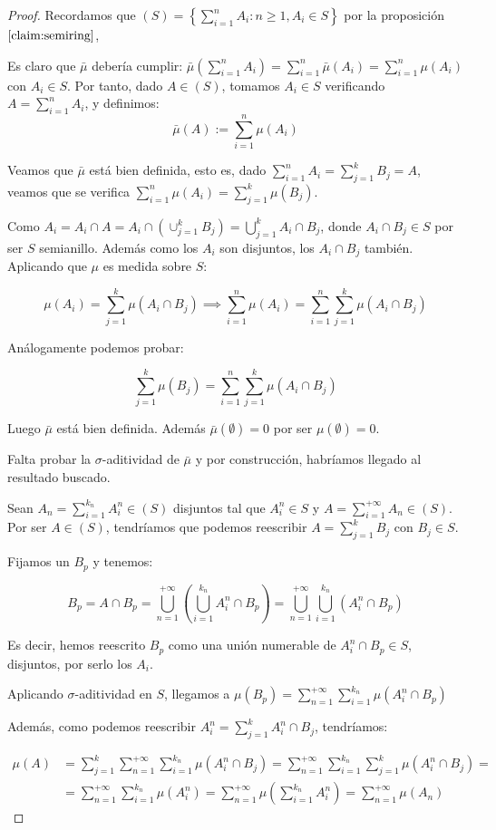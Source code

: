 \begin{proof}
 Recordamos que $(S) = \left\{\sum_{i=1}^n A_i: n\ge 1, A_i \in S \right\}$ por la proposición $\ref{claim:semiring}$,
 
 Es claro que $\bar{\mu}$ debería cumplir: 
 $\bar{\mu}\left(\sum_{i=1}^n A_i\right) = \sum_{i=1}^n \bar{\mu}(A_i) = \sum_{i=1}^n \mu(A_i)$
 con $A_i \in S$. Por tanto, dado $A\in (S)$, tomamos $A_i\in S$ verificando $A = \sum_{i=1}^n A_i$, y definimos: 
 \[\bar{\mu}(A) := \sum_{i=1}^n \mu(A_i)\]
 
 Veamos que $\bar{\mu}$ está bien definida, esto es, dado $\sum_{i=1}^n A_i = \sum_{j=1}^k B_j = A$, 
 veamos que se verifica $\sum_{i=1}^n \mu(A_i) = \sum_{j=1}^k \mu(B_j)$.
 
 Como $A_i = A_i \cap A = A_i \cap \left(\cup_{j=1}^k B_j\right) = \bigcup_{j=1}^k A_i \cap B_j$, donde 
 $A_i \cap B_j \in S$ por ser $S$ semianillo. Además como los $A_i$ son disjuntos, los $A_i\cap B_j$ también.
 Aplicando que $\mu$ es medida sobre $S$:
 
 \[\mu(A_i) = \sum_{j=1}^k \mu(A_i \cap B_j) \implies \sum_{i=1}^n \mu(A_i) = 
              \sum_{i=1}^n \sum_{j=1}^k \mu(A_i \cap B_j)\]
 
 Análogamente podemos probar:
 
 \[\sum_{j=1}^k \mu(B_j) = \sum_{i=1}^n \sum_{j=1}^k \mu(A_i \cap B_j)\]
 
 Luego $\bar{\mu}$ está bien definida. Además $\bar{\mu} (\emptyset) = 0$ por ser $\mu(\emptyset) = 0$.
 
 Falta probar la $\sigma$-aditividad de $\bar{\mu}$ y por construcción, habríamos llegado al resultado buscado.
 
 Sean $A_n = \sum_{i=1}^{k_n} A_i^n \in (S)$ disjuntos tal que $A_i^n \in S$ y $A = \sum_{i=1}^{+\infty} A_n \in (S)$. 
 Por ser $A \in (S)$, tendríamos que podemos reescribir $A = \sum_{j=1}^k B_j$ con $B_j \in S$.
 
 Fijamos un $B_p$ y tenemos:
 
 \[B_p = A \cap B_p = \bigcup_{n=1}^{+\infty} \left(\bigcup_{i=1}^{k_n} A_i^n \cap B_p\right) = 
         \bigcup_{n=1}^{+\infty} \bigcup_{i=1}^{k_n} \left(A_i^n \cap B_p\right)\]
 
 Es decir, hemos reescrito $B_p$ como una unión numerable de $A_i^n \cap B_p \in S$, disjuntos, por serlo los $A_i$. 
 
 Aplicando $\sigma$-aditividad en $S$, llegamos a $\mu(B_p) = \sum_{n=1}^{+\infty} \sum_{i=1}^{k_n} \mu(A_i^n \cap B_p)$
 
 Además, como podemos reescribir $A_i^{n} = \sum_{j=1}^k A_i^{n} \cap B_j$, tendríamos:
 
 \begin{align*}
 \mu(A) &= \sum_{j=1}^k \sum_{n=1}^{+\infty} \sum_{i=1}^{k_n} \mu(A_i^n \cap B_j) = 
           \sum_{n=1}^{+\infty} \sum_{i=1}^{k_n} \sum_{j=1}^k \mu(A_i^n \cap B_j) = \\
        &= \sum_{n=1}^{+\infty} \sum_{i=1}^{k_n} \mu(A_i^n) =
           \sum_{n=1}^{+\infty} \mu \left(\sum_{i=1}^{k_n} A_i^n \right) =
           \sum_{n=1}^{+\infty} \mu(A_n)
 \end{align*}
\end{proof}

